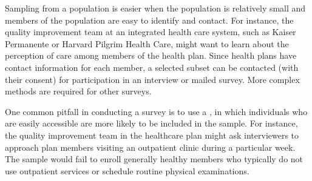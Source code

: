 Sampling from a population is easier when the population is relatively small and members of the population are easy to identify and contact.  For instance, the quality improvement team at an integrated health care system, such as Kaiser Permanente or Harvard Pilgrim Health Care, might want to learn about the perception of care among members of the health plan.  Since health plans have contact information for each member, a selected subset can be contacted (with their consent) for participation in an interview or mailed survey.  More complex methods are required for other surveys.


One common pitfall in conducting a survey is to use a , in which individuals who are easily accessible are more likely to be included in the sample. For instance, the quality improvement team in the healthcare plan might ask interviewers to approach plan members visiting an outpatient clinic during a particular week.  The sample would fail to enroll generally healthy members who typically do not use outpatient services or schedule routine physical examinations. 


